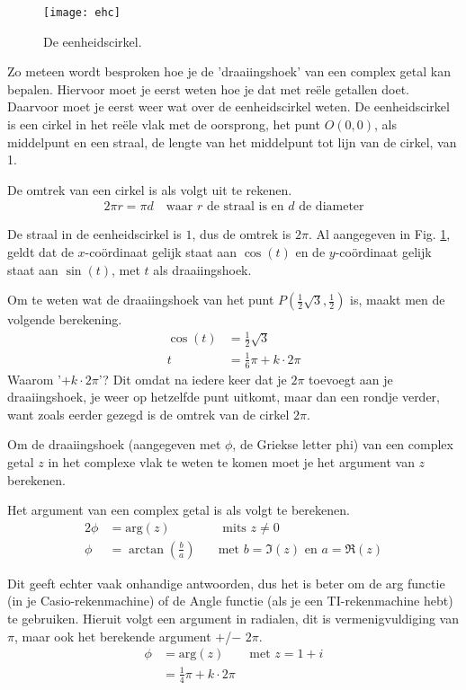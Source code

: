 \documentclass[11pt,fleqn]{book} %
\begin{document}
\begin{figure}[h]
	\centering\texttt{[image: ehc]}
	\caption{De eenheidscirkel.}
	\label{fig:ehc}
\end{figure}

Zo meteen wordt besproken hoe je de 'draaiingshoek' van een complex getal kan bepalen. Hiervoor moet je eerst weten hoe je dat met reële getallen doet. Daarvoor moet je eerst weer wat over de eenheidscirkel weten. De eenheidscirkel is een cirkel in het reële vlak met de oorsprong, het punt $O(0,0)$, als middelpunt en een straal, de lengte van het middelpunt tot lijn van de cirkel, van 1.

\begin{definition}
De omtrek van een cirkel is als volgt uit te rekenen.
\begin{align}\label{eq:2pir}
2\pi r=\pi d \quad\text{waar } r \text{ de straal is en } d \text{ de diameter}
\end{align}
\end{definition}

De straal in de eenheidscirkel is $1$, dus de omtrek is $2\pi$. Al aangegeven in Fig. \ref{fig:ehc}, geldt dat de $x$-coördinaat gelijk staat aan $\cos{(t)}$ en de $y$-coördinaat gelijk staat aan $\sin{(t)}$, met $t$ als draaiingshoek.

Om te weten wat de draaiingshoek van het punt $P(\frac{1}{2}\sqrt{3},\frac{1}{2})$ is, maakt men de volgende berekening.
\begin{align*}
\cos{(t)}&=\frac{1}{2}\sqrt{3}\\
t&=\frac{1}{6}\pi+k\cdot 2\pi
\end{align*}
Waarom '$+ k\cdot2\pi$'? Dit omdat na iedere keer dat je $2\pi$ toevoegt aan je draaiingshoek, je weer op hetzelfde punt uitkomt, maar dan een rondje verder, want zoals eerder gezegd is de omtrek van de cirkel $2\pi$.

Om de draaiingshoek (aangegeven met $\phi$, de Griekse letter phi) van een complex getal $z$ in het complexe vlak te weten te komen moet je het argument van $z$ berekenen.
\begin{definition}
Het argument van een complex getal is als volgt te berekenen.
\begin{alignat*}{2}
\phi &=\text{arg}(z)\quad &\text{ mits }z\neq 0\\
\phi &= \arctan\left(\frac{b}{a}\right)\quad &\text{met } b=\Im(z) \text{ en } a=\Re(z)
\end{alignat*}
\end{definition}
Dit geeft echter vaak onhandige antwoorden, dus het is beter om de arg functie (in je Casio-rekenmachine) of de Angle functie (als je een TI-rekenmachine hebt) te gebruiken. Hieruit volgt een argument in radialen, dit is vermenigvuldiging van $\pi$, maar ook het berekende argument $+$/$-$ $2\pi$.
\begin{align*}
\phi&=\text{arg}(z)\qquad\text{met } z=1+i\\
&=\frac{1}{4}\pi + k\cdot 2\pi\\
\end{align*}
\end{document}
